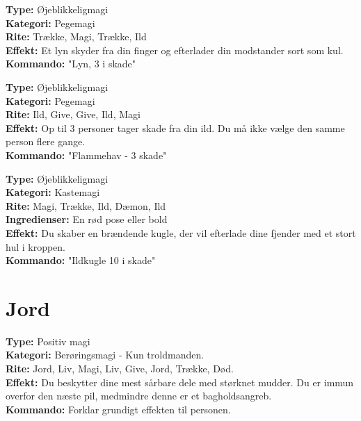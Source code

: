 \begin{ild*}[Lyn]
\textbf{Type:} Øjeblikkeligmagi\\
\textbf{Kategori:} Pegemagi\\
\textbf{Rite:} Trække, Magi, Trække, Ild\\
\textbf{Effekt:} Et lyn skyder fra din finger og efterlader din modstander sort som kul.\\
\textbf{Kommando:} "Lyn, 3 i skade"
\end{ild*}

\begin{ild*}[Flammehav]
\textbf{Type:} Øjeblikkeligmagi\\
\textbf{Kategori:} Pegemagi\\
\textbf{Rite:} Ild, Give, Give, Ild, Magi\\
\textbf{Effekt:} Op til 3 personer tager skade fra din ild. Du må ikke vælge den samme person flere gange.\\
\textbf{Kommando:} "Flammehav - 3 skade"
\end{ild*}

\begin{ild*}[Ildkugle]
\textbf{Type:} Øjeblikkeligmagi\\
\textbf{Kategori:} Kastemagi\\
\textbf{Rite:} Magi, Trække, Ild, Dæmon, Ild\\
\textbf{Ingredienser:} En rød pose eller bold\\
\textbf{Effekt:} Du skaber en brændende kugle, der vil efterlade dine fjender med et stort hul i kroppen.\\
\textbf{Kommando:} "Ildkugle 10 i skade"
\end{ild*}

\section{Jord}
\begin{jord*}
\textbf{Type:} Positiv magi\\
\textbf{Kategori:} Berøringsmagi - Kun troldmanden.\\
\textbf{Rite:} Jord, Liv, Magi, Liv, Give, Jord, Trække, Død. \\
\textbf{Effekt:} Du beskytter dine mest sårbare dele med størknet mudder. Du er immun overfor den næste pil, medmindre denne er et bagholdsangreb.\\
\textbf{Kommando:} Forklar grundigt effekten til personen.
\end{jord*}

